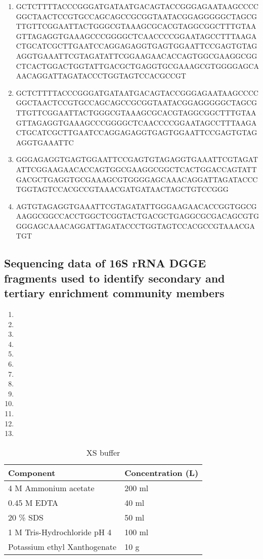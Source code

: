 \documentclass[11pt]{article}
\begin{document}
\begin{enumerate}
\item GCTCTTTTACCCGGGATGATAATGACAGTACCGGGAGAATAAGCCCCGGCTAACTCCGTGCCAGCAGCCGCGGTAATACGGAGGGGGCTAGCGTTGTTCGGAATTACTGGGCGTAAAGCGCACGTAGGCGGCTTTGTAAGTTAGAGGTGAAAGCCCGGGGCTCAACCCCGGAATAGCCTTTAAGACTGCATCGCTTGAATCCAGGAGAGGTGAGTGGAATTCCGAGTGTAGAGGTGAAATTCGTAGATATTCGGAAGAACACCAGTGGCGAAGGCGGCTCACTGGACTGGTATTGACGCTGAGGTGCGAAAGCGTGGGGAGCAAACAGGATTAGATACCCTGGTAGTCCACGCCGT
\item GCTCTTTTACCCGGGATGATAATGACAGTACCGGGAGAATAAGCCCCGGCTAACTCCGTGCCAGCAGCCGCGGTAATACGGAGGGGGCTAGCGTTGTTCGGAATTACTGGGCGTAAAGCGCACGTAGGCGGCTTTGTAAGTTAGAGGTGAAAGCCCGGGGCTCAACCCCGGAATAGCCTTTAAGACTGCATCGCTTGAATCCAGGAGAGGTGAGTGGAATTCCGAGTGTAGAGGTGAAATTC
\item GGGAGAGGTGAGTGGAATTCCGAGTGTAGAGGTGAAATTCGTAGATATTCGGAAGAACACCAGTGGCGAAGGCGGCTCACTGGACCAGTATTGACGCTGAGGTGCGAAAGCGTGGGGAGCAAACAGGATTAGATACCCTGGTAGTCCACGCCGTAAACGATGATAACTAGCTGTCCGGG 
\item AGTGTAGAGGTGAAATTCGTAGATATTGGGAAGAACACCGGTGGCGAAGGCGGCCACCTGGCTCGGTACTGACGCTGAGGCGCGACAGCGTGGGGAGCAAACAGGATTAGATACCCTGGTAGTCCACGCCGTAAACGATGT
\end{enumerate}

\subsection{Sequencing data of 16S rRNA DGGE fragments used to identify secondary and tertiary enrichment community members}
\begin{enumerate}
\item 
\item 
\item 
\item 
\item 
\item 
\item 
\item 
\item 
\item 
\item 
\item 
\item 
\end{enumerate}

\begin{table}
\caption{XS buffer}
\begin{tabular}{  p{6.9cm} | p{6.9cm}  }
\hline
Component & Concentration (L) \\
\hline
 4 M Ammonium acetate & 200 ml  \\
  0.45 M EDTA  & 40 ml \\
    20 \% SDS  & 50 ml \\
    1 M Tris-Hydrochloride pH 4    & 100 ml  \\
        Potassium ethyl Xanthogenate  & 10 g  \\
  \hline
\end{tabular}
\end{table}
\end{document}
